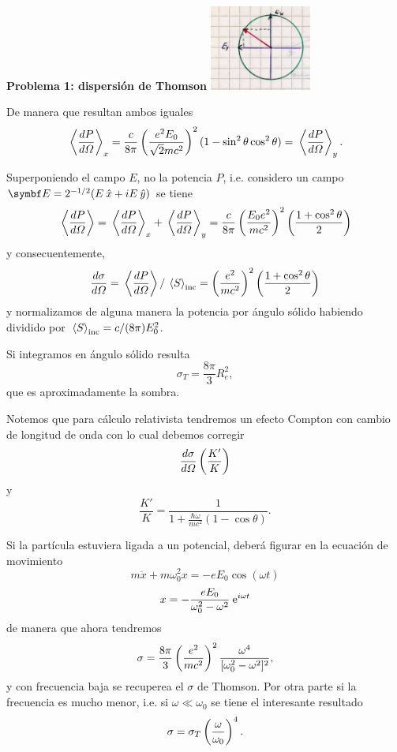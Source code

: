 \documentclass[10pt,oneside]{CBFT_book}
\begin{document}
\begin{ejemplo}{\bf Problema 1: dispersión de Thomson}
\includegraphics[width=0.25\textwidth]{images/fig_ft1_proble_thomson2.jpg}
 
De manera que resultan ambos iguales
\[
	\:\left\langle \frac{d^{\hspace{-0.05em}} {P}}{d {\Omega}^{\hspace{-0.05em}}} \right\rangle_x = \frac{c}{8\pi}\left( \frac{  e^2 E_0 }{  \sqrt{2} m c^2  } \right)^2 
	( 1 - \sin^2\theta \cos^2\theta ) = \:\left\langle \frac{d^{\hspace{-0.05em}} {P}}{d {\Omega}^{\hspace{-0.05em}}} \right\rangle_y.
\]

Superponiendo el campo $E$, no la potencia $P$, i.e. considero un campo $ \vb{E} = 2^{-1/2}
( E\xver + i E \yver ) $ se tiene 
\[
	\:\left\langle \frac{d^{\hspace{-0.05em}} {P}}{d {\Omega}^{\hspace{-0.05em}}} \right\rangle = \:\left\langle \frac{d^{\hspace{-0.05em}} {P}}{d {\Omega}^{\hspace{-0.05em}}} \right\rangle_x + \:\left\langle \frac{d^{\hspace{-0.05em}} {P}}{d {\Omega}^{\hspace{-0.05em}}} \right\rangle_y =
	\frac{c}{8\pi} \left( \frac{ E_0e^2 }{ mc^2 } \right)^2 \left( \frac{ 1+\cos^2\theta }{ 2 } \right)
\]
y consecuentemente,
\[
	\frac{d^{\hspace{-0.05em}} {\sigma}}{d {\Omega}^{\hspace{-0.05em}}} = \:\left\langle \frac{d^{\hspace{-0.05em}} {P}}{d {\Omega}^{\hspace{-0.05em}}} \right\rangle / \:\left\langle S \right\rangle_\text{inc} =
	\left( \frac{ e^2 }{ mc^2 } \right)^2 \left( \frac{ 1+\cos^2\theta }{ 2 } \right)
\]
y normalizamos de alguna manera la potencia por ángulo sólido habiendo dividido por 
$ \:\left\langle S \right\rangle_\text{inc} = c/(8\pi) E_0^2$.

Si integramos en ángulo sólido resulta
\[
	\sigma_T = \frac{8\pi}{3}R^2_e,
\]
que es aproximadamente la sombra.

Notemos que para cálculo relativista tendremos un efecto Compton con cambio de longitud de onda
con lo cual debemos corregir 
\[
	\frac{d^{\hspace{-0.05em}} {\sigma}}{d {\Omega}^{\hspace{-0.05em}}}\left( \frac{ K' }{ K } \right)
\]
y
\[
	\frac{K'}{K} = \frac{1}{\displaystyle 1 + \frac{\hbar\omega}{mc^2}(1-\cos\theta)}.
\]

Si la partícula estuviera ligada a un potencial, deberá figurar en la ecuación de movimiento
\[
	m\ddot{x} + m \omega_0^2x = -e E_0 \cos(\omega t)
\]
\[
	x = - \frac{e E_0}{\omega_0^2 - \omega^2} \:\mathrm{e}^{i\omega t}
\]
de manera que ahora tendremos
\[
	\sigma = \frac{8\pi}{3}\left( \frac{ e^2 }{ mc^2 } \right)^2 \frac{\omega^4}{[\omega_0^2 - \omega^2]^2},
\]
y con frecuencia baja se recuperea el $\sigma$ de Thomson. Por otra parte si la frecuencia
es mucho menor, i.e. si $\omega \ll \omega_0$ se tiene el interesante resultado
\[
	\sigma = \sigma_T \left( \frac{ \omega }{ \omega_0 } \right)^4.
\]

\end{ejemplo}

\end{document}
